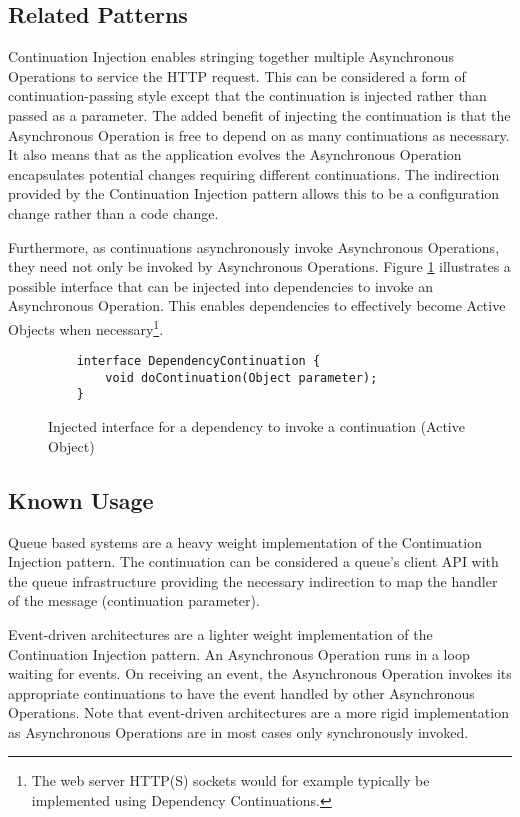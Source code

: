 \documentclass[prodmode]{style/acmlarge}
\begin{document}
\subsection{Related Patterns}

Continuation Injection enables stringing together multiple Asynchronous
Operations to service the HTTP request.  This can be considered a form of
continuation-passing style \cite{continuations} except that the continuation is
injected rather than passed as a parameter.  The added benefit of injecting the
continuation is that the Asynchronous Operation is free to depend on as many
continuations as necessary.  It also means that as the application evolves the
Asynchronous Operation encapsulates potential changes requiring different
continuations.  The indirection provided by the Continuation Injection pattern
allows this to be a configuration change rather than a code change.

Furthermore, as continuations asynchronously invoke Asynchronous Operations,
they need not only be invoked by Asynchronous Operations. Figure
\ref{fig:DC_interface} illustrates a possible interface that can be injected
into dependencies to invoke an Asynchronous Operation.  This enables
dependencies to effectively become Active Objects \cite{active-object} when
necessary\footnote{The web server HTTP(S) sockets would for example typically be
implemented using Dependency Continuations.}.

\begin{figure}[tp]
\begin{verbatim}
    interface DependencyContinuation {
        void doContinuation(Object parameter);
    }
\end{verbatim}
\caption{Injected interface for a dependency to invoke a continuation (Active Object)}
\label{fig:DC_interface}
\end{figure}


\subsection{Known Usage}

Queue based systems are a heavy weight implementation of the Continuation
Injection pattern.  The continuation can be considered a queue's client API with the
queue infrastructure providing the necessary indirection to map the handler of
the message (continuation parameter).

Event-driven architectures are a lighter weight implementation of the
Continuation Injection pattern.  An Asynchronous Operation runs in a loop
waiting for events.  On receiving an event, the Asynchronous Operation invokes
its appropriate continuations to have the event handled by other Asynchronous
Operations.  Note that event-driven architectures are a more rigid
implementation as Asynchronous Operations are in most cases only synchronously
invoked.
\end{document}

